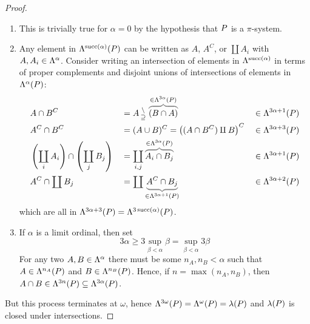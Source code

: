 \documentclass{scrartcl}
\newcommand{\propersetminus}{\begin{smallmatrix} \setminus\\\supseteq \end{smallmatrix}}%
\DeclareMathOperator*{\bigdisjunion}{\coprod}
\newcommand{\disjunion}{\mathbin{\amalg}}
\DeclareMathOperator{\successor}{succ}
\begin{document}
\begin{proof}
  \begin{enumerate}
  \item This is trivially true for \(\alpha=0\) by the hypothesis that \(P\) is a \(\pi\)-system.
  \item Any element in \(\lambdify^{\successor(\alpha)}(\pisystem)\) can be written as
    \(A\), \(A^C\), or \(\bigdisjunion A_i\) with \(A,A_i\in\Lambda^{\alpha}\).
    Consider writing an intersection of elements in
    \(\lambdify^{\successor(\alpha)}\) in terms of proper complements and disjoint
    unions of intersections of elements in \(\Lambda^\alpha(P)\):
      \begin{align*}
        &A\cap B^C &&= A\propersetminus \grayoverbrace{(B\cap A)}{\in \lambdify^{3\alpha}(\pisystem)} &&\in \lambdify^{3\alpha+1}(\pisystem) \\
        &A^C\cap B^C &&= (A\cup B)^C = \left((A\cap B^C)\disjunion B  \right)^C &&\in \lambdify^{3\alpha+3}(\pisystem) \\
        & \left(\bigdisjunion_{i} A_i\right) \cap
        \left(\bigdisjunion_j B_j\right) &&= \bigdisjunion_{i,j}
        \grayoverbrace{A_i\cap B_j}{\in\lambdify^{3\alpha}(\pisystem)} &&\in
        \lambdify^{3\alpha+1}(\pisystem) \\
       & A^C \cap \bigdisjunion B_j &&= \bigdisjunion \grayunderbrace{A^C\cap
           B_j}{\in\lambdify^{3\alpha+1}(\pisystem)} &&\in\lambdify^{3\alpha+2}(\pisystem)
      \end{align*}
    which are all in \(\lambdify^{3\alpha+3}(\pisystem)=\lambdify^{3\successor(\alpha)}(\pisystem)\).
  \item
    If \(\alpha\) is a limit ordinal, then set
    \[
      3\alpha \geq 3\sup_{\beta <\alpha}\beta = \sup_{\beta <
        \alpha}3\beta
    \]
    For any two \(A,B\in\Lambda^\alpha\) there must be some \(n_A,n_B<\alpha\)
    such that \(A\in \Lambda^{n_A}(P)\) and
    \(B\in\Lambda^{n_B}(P)\). Hence, if \(n=\max(n_A,n_B)\), then
    \(A\cap B\in \Lambda^{3n}(P)\subseteq
    \Lambda^{3\alpha}(P)\).
  \end{enumerate}
  But this process terminates at \(\omega\), hence
  \(\Lambda^{3\omega}(P)=\Lambda^\omega(P)=\lambda(P)\)
  and \(\lambda(P)\) is closed under intersections.
\end{proof}
\end{document}
